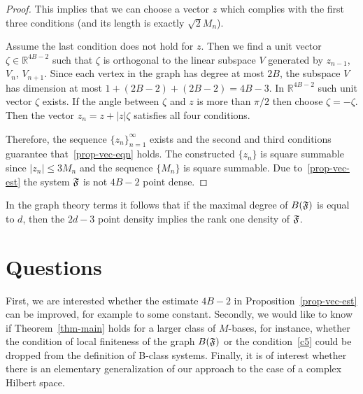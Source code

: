 \documentclass[12pt,oneside,a4paper]{amsart}
\begin{document}
\begin{proof}
        This implies that we can choose a vector $z$ which complies with the first three conditions (and its length is exactly $\sqrt{2}M_n$).

        Assume the last condition does not hold for $z$.
        Then we find a unit vector $\zeta \in \mathbb{R}^{4B - 2}$ such that $\zeta$ is orthogonal to the linear subspace $V$ generated by
          $z_{n-1}$, $V_{n}$, $V_{n + 1}$.
        Since each vertex in the graph has degree at most $2B$, the subspace $V$ has dimension at most $1 + (2B - 2) + (2B - 2) = 4B - 3$.
        In $\mathbb{R}^{4B-2}$ such unit vector $\zeta$ exists.
        If the angle between $\zeta$ and $z$ is more than $\pi/2$ then choose $\zeta = -\zeta$.
        Then the vector $z_n = z + \lvert z \rvert \zeta$ satisfies all four conditions.

        Therefore, the sequence $\{z_n\}_{n=1}^\infty$ exists and the second and third conditions guarantee that~\eqref{prop-vec-eqn} holds.
        The constructed $\{z_n\}$ is square summable since $\lvert z_n \rvert \leq 3M_n$ and the sequence $\{M_n\}$ is square summable.
        Due to~\eqref{prop-vec-est} the system $\mathfrak{F}$ is not $4B - 2$ point dense.
      \end{proof}
      \begin{remark*}
        In the graph theory terms it follows that if the maximal degree of $B(\mathfrak{F})$ is equal to $d$,
          then the $2d - 3$ point density implies the rank one density of $\mathfrak{F}$.
      \end{remark*}
  \bigskip
  \section{Questions}
    First, we are interested whether the estimate $4B - 2$ in Proposition~\eqref{prop-vec-est} can be improved, for example to some constant.
    Secondly, we would like to know if Theorem~\ref{thm-main} holds for a larger class of $M$-bases, for instance, whether the condition of
      local finiteness of the graph $B(\mathfrak{F})$ or the condition~\ref{c5} could be dropped from the definition of B-class systems.
    Finally, it is of interest whether there is an elementary generalization of our approach to the case of a complex Hilbert space.
\end{document}

